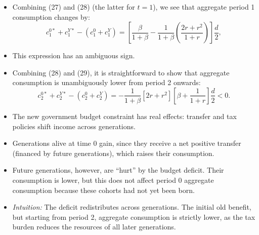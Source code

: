 \documentclass[12pt]{article}
\begin{document}
\begin{itemize}
  \item Combining (27) and (28) (the latter for $t=1$), we see that aggregate period 1 consumption changes by:
  \[
  c_{1}^{0*} + c_{1}^{Y*} - (c_{1}^{0} + c_{1}^{Y}) 
  = \left[\frac{\beta}{1+\beta} - \frac{1}{1+\beta}\left(\frac{2r+r^{2}}{1+r}\right)\right]\frac{d}{2},
  \]
  
  \item This expression has an ambiguous sign.

  \item Combining (28) and (29), it is straightforward to show that aggregate consumption is unambiguously lower from period 2 onwards:
  \[
  c_{2}^{0*} + c_{2}^{Y*} - (c_{2}^{0} + c_{2}^{Y}) 
  = -\frac{1}{1+\beta}[2r+r^{2}]\left[\beta + \frac{1}{1+r}\right]\frac{d}{2} < 0.
  \]

  \item The new government budget constraint has real effects: transfer and tax policies shift income across generations.

  \item Generations alive at time 0 gain, since they receive a net positive transfer (financed by future generations), which raises their consumption.

  \item Future generations, however, are “hurt” by the budget deficit. Their consumption is lower, but this does not affect period 0 aggregate consumption because these cohorts had not yet been born.

  \item \textit{Intuition:} The deficit redistributes across generations. The initial old benefit, but starting from period 2, aggregate consumption is strictly lower, as the tax burden reduces the resources of all later generations.
\end{itemize}
\end{document}
